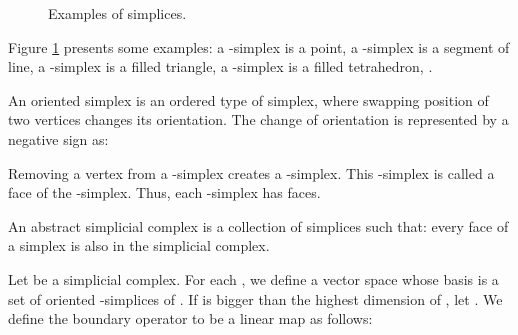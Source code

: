 \documentclass[conference]{IEEEtran}
\makeatletter
\newcommand*{\etc}{\@ifnextchar{.}{etc}{etc.\@\xspace}}
\makeatother
\begin{document}
\begin{figure}[H]
\centering
{}
\caption{Examples of simplices.}
\label{fig_simplex}
\end{figure}

%
 Figure \ref{fig_simplex} presents some examples: a -simplex is a point, a -simplex is a
segment of line, a -simplex is a filled triangle, a -simplex is
a filled tetrahedron, \etc.

An oriented simplex is an ordered type of simplex, where swapping
position of two vertices changes its orientation. The change of
orientation is represented by a negative sign as:


Removing a vertex from a -simplex creates a -simplex. This
-simplex is called a face of the -simplex. Thus, each
-simplex has  faces.

An abstract simplicial complex is a collection of simplices such that: every face of a simplex is also in the simplicial complex.

Let  be a simplicial complex. For each , we define a vector
space  whose basis is a set of oriented -simplices of
. If  is bigger than the highest dimension of , let . We define the boundary operator to be a linear map  as follows:
\end{document}

